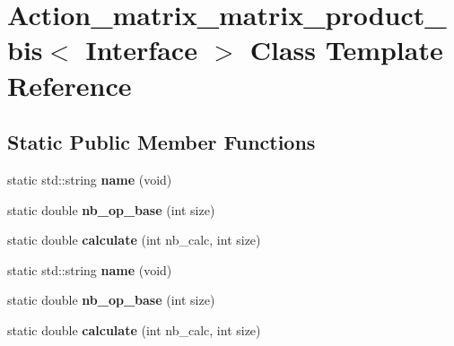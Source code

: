 \hypertarget{class_action__matrix__matrix__product__bis}{}\section{Action\+\_\+matrix\+\_\+matrix\+\_\+product\+\_\+bis$<$ Interface $>$ Class Template Reference}
\label{class_action__matrix__matrix__product__bis}
\subsection*{Static Public Member Functions}
\begin{DoxyCompactItemize}
\item 
\mbox{\label{class_action__matrix__matrix__product__bis_a157c17862ea78e6c110f597a0782bf6b}} 
static std\+::string {\bfseries name} (void)
\item 
\mbox{\label{class_action__matrix__matrix__product__bis_a6bb3d1588542f611efba8155feb600f3}} 
static double {\bfseries nb\+\_\+op\+\_\+base} (int size)
\item 
\mbox{\label{class_action__matrix__matrix__product__bis_a1b695f4063ae9db62a80d3bd2cc65a41}} 
static double {\bfseries calculate} (int nb\+\_\+calc, int size)
\item 
\mbox{\label{class_action__matrix__matrix__product__bis_a157c17862ea78e6c110f597a0782bf6b}} 
static std\+::string {\bfseries name} (void)
\item 
\mbox{\label{class_action__matrix__matrix__product__bis_a6bb3d1588542f611efba8155feb600f3}} 
static double {\bfseries nb\+\_\+op\+\_\+base} (int size)
\item 
\mbox{\label{class_action__matrix__matrix__product__bis_a1b695f4063ae9db62a80d3bd2cc65a41}} 
static double {\bfseries calculate} (int nb\+\_\+calc, int size)
\end{DoxyCompactItemize}


